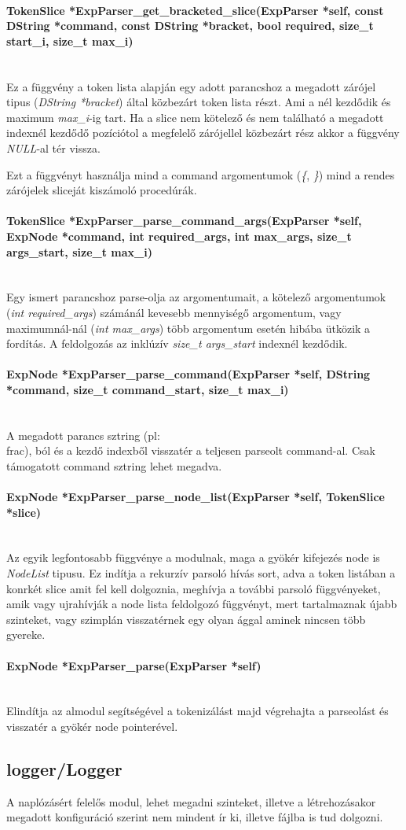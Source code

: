\documentclass{article}[12pt,a4paper]
\newcommand{\fn}[1]{\paragraph{#1}\mbox{}\\}
\begin{document}
    \fn{TokenSlice *ExpParser\_get\_bracketed\_slice(ExpParser *self, const DString *command, const DString *bracket, bool required, size\_t start\_i, size\_t max\_i)}
    Ez a függvény a token lista alapján egy adott parancshoz a megadott zárójel tipus (\textit{DString *bracket}) által közbezárt token lista részt.
    Ami a  nél kezdődik és maximum \textit{max\_i}-ig tart.
    Ha a slice nem kötelező és nem található a megadott indexnél kezdődő pozíciótol a megfelelő zárójellel közbezárt rész akkor a függvény \textit{NULL}-al tér vissza.

    Ezt a függvényt használja mind a command argomentumok (\textit{\{}, \textit{\}}) mind a rendes zárójelek sliceját kiszámoló procedúrák.

    \fn{TokenSlice *ExpParser\_parse\_command\_args(ExpParser *self, ExpNode *command, int required\_args, int max\_args, size\_t args\_start, size\_t max\_i)}
    Egy ismert parancshoz parse-olja az argomentumait, a kötelező argomentumok (\textit{int required\_args}) számánál kevesebb mennyiségő argomentum, vagy maximumnál-nál (\textit{int max\_args}) több argomentum esetén hibába ütközik a fordítás.
    A feldolgozás az inklúzív \textit{size\_t args\_start} indexnél kezdődik.

    \fn{ExpNode *ExpParser\_parse\_command(ExpParser *self, DString *command, size\_t command\_start, size\_t max\_i)}
    A megadott parancs sztring (pl: \\frac), ból és a kezdő indexből visszatér a teljesen parseolt command-al.
    Csak támogatott command sztring lehet megadva.

    \fn{ExpNode *ExpParser\_parse\_node\_list(ExpParser *self, TokenSlice *slice)}
    Az egyik legfontosabb függvénye a modulnak, maga a gyökér kifejezés node is \textit{NodeList} tipusu.
    Ez indítja a rekurzív parsoló hívás sort, adva a token listában a konrkét slice amit fel kell dolgoznia, meghívja a további parsoló függvényeket, amik vagy ujrahívják a node lista feldolgozó függvényt, mert tartalmaznak újabb szinteket, vagy szimplán visszatérnek egy olyan ággal aminek nincsen több gyereke.

    \fn{ExpNode *ExpParser\_parse(ExpParser *self)}
    Elindítja az almodul segítségével a tokenizálást majd végrehajta a parseolást és visszatér a gyökér node pointerével.

    \subsection{logger/Logger}
    A naplózásért felelős modul, lehet megadni szinteket, illetve a létrehozásakor megadott konfiguráció szerint nem mindent ír ki, illetve fájlba is tud dolgozni.
\end{document}

